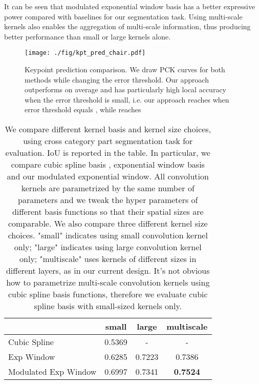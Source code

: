 \documentclass[10pt,twocolumn,letterpaper]{article}
\begin{document}
It can be seen that modulated exponential window basis has a better expressive power compared with baselines for our segmentation task. Using multi-scale kernels also enables the aggregation of multi-scale information, thus producing better performance than small or large kernels alone. 
\begin{figure}[t!]
    \centering
    \texttt{[image: ./fig/kpt\_pred\_chair.pdf]}
    \caption{Keypoint prediction comparison. We draw PCK curves for both methods while changing the error threshold. Our approach outperforms \cite{huang2013fine} on average and has particularly high local accuracy when the error threshold is small, i.e. our approach reaches  when error threshold equals , while \cite{huang2013fine} reaches }
    \label{fig:keypoint}
    \vspace{-0.5cm}
\end{figure}


\begin{table}[h!]
\centering
\small
{
\begin{tabular}{@{}lccc}
\toprule
 & small & large & multiscale \\ \midrule
Cubic Spline & 0.5369 & \multicolumn{1}{c}{-} & \multicolumn{1}{c}{-} \\
Exp Window & 0.6285 & 0.7223 & 0.7386 \\
Modulated Exp Window & 0.6997 & 0.7341 & \textbf{0.7524} \\ \bottomrule
\end{tabular}
}
\caption{We compare different kernel basis and kernel size choices, using cross category part segmentation task for evaluation. IoU is reported in the table. In particular, we compare cubic spline basis \cite{bruna2013spectral}, exponential window basis \cite{boscaini2016learning} and our modulated exponential window. All convolution kernels are parametrized by the same number of parameters and we tweak the hyper parameters of different basis functions so that their spatial sizes are comparable. We also compare three different kernel size choices. "small" indicates using small convolution kernel only; "large" indicates using large convolution kernel only; "multiscale" uses kernels of different sizes in different layers, as in our current design. It's not obvious how to parametrize multi-scale convolution kernels using cubic spline basis functions, therefore we evaluate cubic spline basis with small-sized kernels only.} 
\label{tab:kerneldesign}
\vspace{-0.3cm}
\end{table}
\end{document}
